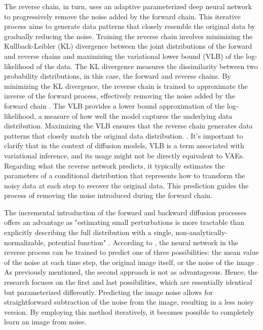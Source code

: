 The reverse chain, in turn, uses an adaptive parameterized deep neural network to progressively remove the noise added by the forward chain. This iterative process aims to generate data patterns that closely resemble the original data by gradually reducing the noise. Training the reverse chain involves minimizing the Kullback-Leibler (KL) divergence between the joint distributions of the forward and reverse chains and maximizing the variational lower bound (VLB) of the log-likelihood of the data. The KL divergence measures the dissimilarity between two probability distributions, in this case, the forward and reverse chains. By minimizing the KL divergence, the reverse chain is trained to approximate the inverse of the forward process, effectively removing the noise added by the forward chain \citep{sohlDDPM}. The VLB provides a lower bound approximation of the log-likelihood, a measure of how well the model captures the underlying data distribution. Maximizing the VLB ensures that the reverse chain generates data patterns that closely match the original data distribution. \citep{hoDDPMs, sohlDDPM}. It's important to clarify that in the context of diffusion models, VLB is a term associated with variational inference, and its usage might not be directly equivalent to VAEs. Regarding what the reverse network predicts, it typically estimates the parameters of a conditional distribution that represents how to transform the noisy data at each step to recover the original data. This prediction guides the process of removing the noise introduced during the forward chain.

The incremental introduction of the forward and backward diffusion processes offers an advantage as "estimating small perturbations is more tractable than explicitly describing the full distribution with a single, non-analytically-normalizable, potential function" \citep{sohlDDPM}.
According to \citep{hoDDPMs}, the neural network in the reverse process can be trained to predict one of three possibilities: the mean value of the noise at each time step, the original image itself, or the noise of the image \citep{hoDDPMs}. As previously mentioned, the second approach is not as advantageous. Hence, the research focuses on the first and last possibilities, which are essentially identical but parameterized differently. Predicting the image noise allows for straightforward subtraction of the noise from the image, resulting in a less noisy version. By employing this method iteratively, it becomes possible to completely learn an image from noise.


